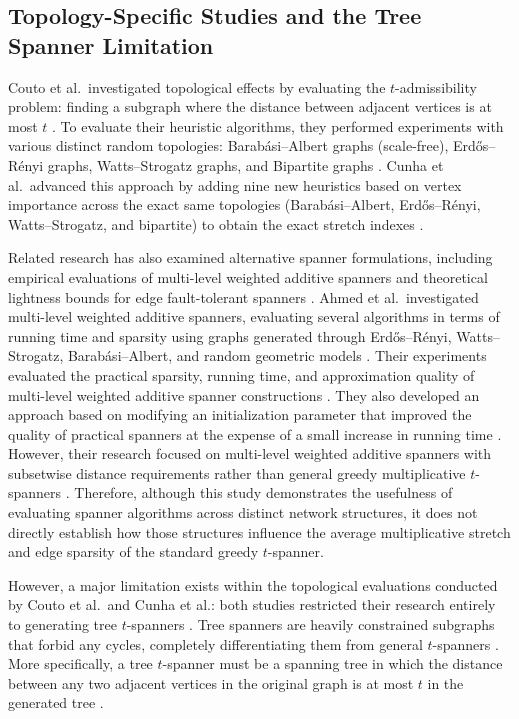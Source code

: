 \documentclass[conference]{IEEEtran}
\begin{document}
\subsection{Topology-Specific Studies and the Tree Spanner Limitation}
Couto et al.\ investigated topological effects by evaluating the $t$-admissibility problem: finding a subgraph where the distance between adjacent vertices is at most $t$ \cite{ref12}. To evaluate their heuristic algorithms, they performed experiments with various distinct random topologies: Barab\'{a}si--Albert graphs (scale-free), Erd\H{o}s--R\'{e}nyi graphs, Watts--Strogatz graphs, and Bipartite graphs \cite{ref12}. Cunha et al.\ advanced this approach by adding nine new heuristics based on vertex importance across the exact same topologies (Barab\'{a}si--Albert, Erd\H{o}s--R\'{e}nyi, Watts--Strogatz, and bipartite) to obtain the exact stretch indexes \cite{ref11}.

Related research has also examined alternative spanner formulations, including empirical evaluations of multi-level weighted additive spanners \cite{ref10} and theoretical lightness bounds for edge fault-tolerant spanners \cite{ref26}. Ahmed et al.\ investigated multi-level weighted additive spanners, evaluating several algorithms in terms of running time and sparsity using graphs generated through Erd\H{o}s--R\'{e}nyi, Watts--Strogatz, Barab\'{a}si--Albert, and random geometric models \cite{ref10}. Their experiments evaluated the practical sparsity, running time, and approximation quality of multi-level weighted additive spanner constructions \cite{ref10}. They also developed an approach based on modifying an initialization parameter that improved the quality of practical spanners at the expense of a small increase in running time \cite{ref10}. However, their research focused on multi-level weighted additive spanners with subsetwise distance requirements rather than general greedy multiplicative $t$-spanners \cite{ref10}. Therefore, although this study demonstrates the usefulness of evaluating spanner algorithms across distinct network structures, it does not directly establish how those structures influence the average multiplicative stretch and edge sparsity of the standard greedy $t$-spanner.

However, a major limitation exists within the topological evaluations conducted by Couto et al.\ and Cunha et al.: both studies restricted their research entirely to generating tree $t$-spanners \cite{ref11, ref12}. Tree spanners are heavily constrained subgraphs that forbid any cycles, completely differentiating them from general $t$-spanners \cite{ref11, ref12}. More specifically, a tree $t$-spanner must be a spanning tree in which the distance between any two adjacent vertices in the original graph is at most $t$ in the generated tree \cite{ref11}.
\end{document}

